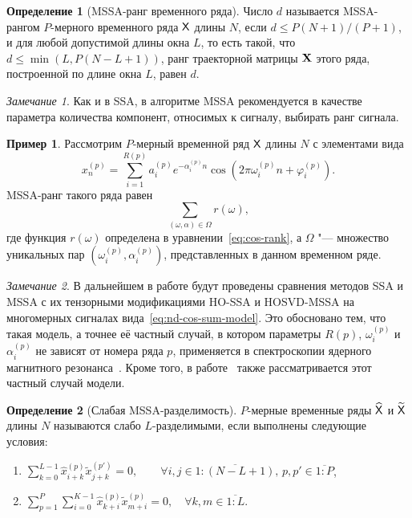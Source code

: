 \documentclass[specialist,
  substylefile=spbu_report.rtx,
subf,href,colorlinks=true, 12pt]{disser}
\theoremstyle{plain}
\theoremstyle{definition}
\newtheorem{definition}{Определение}[section]
\newtheorem{example}{Пример}[section]
\theoremstyle{remark}
\newtheorem*{remark}{Замечание}
\begin{document}
\begin{definition}[MSSA-ранг временного ряда]
  \label{def:mssa-rank}
  Число $d$ называется MSSA-рангом $P$-мерного временного ряда $\mathsf{X}$ длины $N$, если $d \leqslant P(N+1) / (P+1)$,
  и для любой допустимой
  длины окна $L$,
  то есть такой, что $d \leqslant \min(L, P(N- L + 1))$, ранг траекторной матрицы $\mathbf{X}$ этого ряда,
  построенной по длине окна $L$, равен $d$.
\end{definition}
\begin{remark}
  Как и в SSA, в алгоритме MSSA рекомендуется в качестве параметра количества компонент, относимых к сигналу,
  выбирать ранг сигнала.
\end{remark}
\begin{example}
  \label{ex:mssa-ranks}
  Рассмотрим $P$-мерный временной ряд $\mathsf{X}$ длины $N$ с элементами вида
  \begin{equation}
    \label{eq:nd-cos-sum-model}
    x_n^{(p)} = \sum_{i=1}^{R(p)} a_i^{(p)} e^{-\alpha_i^{(p)} n}
    \cos\left(2 \pi \omega_i^{(p)} n + \varphi_i^{(p)}\right).
  \end{equation}
  MSSA-ранг такого ряда равен
  \begin{equation}
    \sum_{(\omega, \alpha)\in \Omega} r(\omega),
  \end{equation}
  где функция $r(\omega)$ определена в уравнении~\eqref{eq:cos-rank}, а $\Omega$ "--- множество уникальных пар
  \linebreak $\left(\omega_i^{(p)}, \alpha_i^{(p)}\right)$, представленных в данном временном ряде.
\end{example}

\begin{remark}
  В дальнейшем в работе будут проведены сравнения методов SSA и MSSA с их тензорными модификациями
  HO-SSA и HOSVD-MSSA на многомерных сигналах вида~\eqref{eq:nd-cos-sum-model}.
  Это обосновано тем, что такая модель, а точнее её частный случай, в котором параметры $R(p)$, $\omega_i^{(p)}$
  и $\alpha_i^{(p)}$ не зависят от номера ряда $p$, применяется в спектроскопии ядерного магнитного
  резонанса~\cite{NMR}.
  Кроме того, в работе~\cite{hosvd-hooi-separation} также рассматривается этот частный случай модели.
\end{remark}

\begin{definition}[Слабая MSSA-разделимость]
  \label{def:mssa-separability}
  $P$-мерные временные ряды $\widehat{\mathsf{X}}$ и $\widetilde{\mathsf{X}}$ длины $N$ называются слабо $L$-разделимыми, если
  выполнены следующие условия:
  \begin{enumerate}
    \item $\displaystyle \sum_{k=0}^{L-1} \hat{x}_{i+k}^{(p)}\tilde{x}_{j+k}^{(p')} = 0,
      \qquad \forall i, j \in \overline{1:(N-L+1)},\, p, p' \in \overline{1:P}$,
    \item $\displaystyle \sum_{p=1}^{P} \sum_{i=0}^{K-1} \hat{x}_{k+i}^{(p)} \tilde{x}_{m+i}^{(p)} = 0, \quad
      \forall k, m \in \overline{1:L}$.
  \end{enumerate}
\end{definition}
\end{document}
